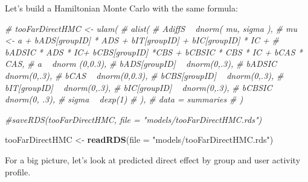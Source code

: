 \documentclass[10pt,dvipsnames,enabledeprecatedfontcommands]{scrartcl}
\newenvironment{Shaded}{\begin{snugshade}}{\end{snugshade}}
\newcommand{\KeywordTok}[1]{\textcolor[rgb]{0.13,0.29,0.53}{\textbf{#1}}}
\newcommand{\DataTypeTok}[1]{\textcolor[rgb]{0.13,0.29,0.53}{#1}}
\newcommand{\StringTok}[1]{\textcolor[rgb]{0.31,0.60,0.02}{#1}}
\newcommand{\CommentTok}[1]{\textcolor[rgb]{0.56,0.35,0.01}{\textit{#1}}}
\newcommand{\NormalTok}[1]{#1}
\begin{document}
\normalsize

Let's build a Hamiltonian Monte Carlo with the same formula:

\vspace{1mm} \footnotesize

\begin{Shaded}
\begin{Highlighting}[]
\CommentTok{# tooFarDirectHMC <- ulam(}
\CommentTok{#   alist(}
\CommentTok{#     AdiffS ~ dnorm( mu, sigma ),}
\CommentTok{#     mu <- a + bADS[groupID] * ADS +  bIT[groupID] + bIC[groupID] * IC + }
\CommentTok{#       bADSIC * ADS * IC+ bCBS[groupID] *CBS + bCBSIC * CBS * IC + bCAS * CAS, }
\CommentTok{#     a ~ dnorm (0,0.3),}
\CommentTok{#     bADS[groupID] ~ dnorm(0,.3),}
\CommentTok{#     bADSIC ~ dnorm(0,.3),}
\CommentTok{#     bCAS ~ dnorm(0,0.3),}
\CommentTok{#     bCBS[groupID] ~ dnorm(0,.3),}
\CommentTok{#     bIT[groupID] ~ dnorm(0,.3),}
\CommentTok{#     bIC[groupID] ~ dnorm(0,.3),}
\CommentTok{#     bCBSIC ~ dnorm(0, .3),}
\CommentTok{#     sigma  ~ dexp(1)}
\CommentTok{#   ), }
\CommentTok{#   data = summaries}
\CommentTok{# )}


\CommentTok{#saveRDS(tooFarDirectHMC, file = "models/tooFarDirectHMC.rds")}

\NormalTok{tooFarDirectHMC <-}\StringTok{ }\KeywordTok{readRDS}\NormalTok{(}\DataTypeTok{file =} \StringTok{"models/tooFarDirectHMC.rds"}\NormalTok{)}
\end{Highlighting}
\end{Shaded}

\normalsize

For a big picture, let's look at predicted direct effect by group and
user activity profile.

\vspace{1mm} \footnotesize
\end{document}
